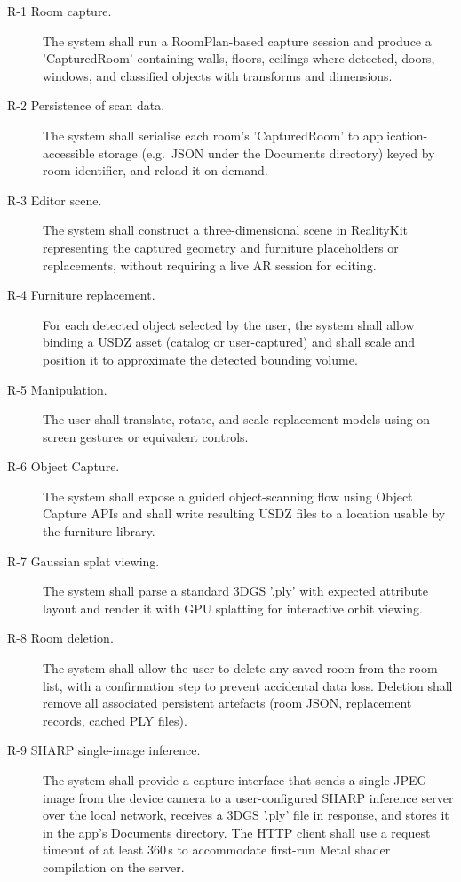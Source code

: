 \begin{description}
    \item[R-1 Room capture.] The system shall run a RoomPlan-based capture session and produce a 'CapturedRoom' containing walls, floors, ceilings where detected, doors, windows, and classified objects with transforms and dimensions.

    \item[R-2 Persistence of scan data.] The system shall serialise each room's 'CapturedRoom' to application-accessible storage (e.g.\ JSON under the Documents directory) keyed by room identifier, and reload it on demand.

    \item[R-3 Editor scene.] The system shall construct a three-dimensional scene in RealityKit representing the captured geometry and furniture placeholders or replacements, without requiring a live AR session for editing.

    \item[R-4 Furniture replacement.] For each detected object selected by the user, the system shall allow binding a USDZ asset (catalog or user-captured) and shall scale and position it to approximate the detected bounding volume.

    \item[R-5 Manipulation.] The user shall translate, rotate, and scale replacement models using on-screen gestures or equivalent controls.

    \item[R-6 Object Capture.] The system shall expose a guided object-scanning flow using Object Capture APIs and shall write resulting USDZ files to a location usable by the furniture library.

    \item[R-7 Gaussian splat viewing.] The system shall parse a standard 3DGS '.ply' with expected attribute layout and render it with GPU splatting for interactive orbit viewing.

    \item [R-8 Room deletion.] The system shall allow the user to delete any saved room from the room list, with a confirmation step to prevent accidental data loss. Deletion shall remove all associated persistent artefacts (room JSON, replacement records, cached PLY files).

    \item [R-9 SHARP single-image inference.] The system shall provide a capture interface that sends a single JPEG image from the device camera to a user-configured SHARP inference server over the local network, receives a 3DGS '.ply' file in response, and stores it in the app's Documents directory. The HTTP client shall use a request timeout of at least 360\,s to accommodate first-run Metal shader compilation on the server.


\end{description}
